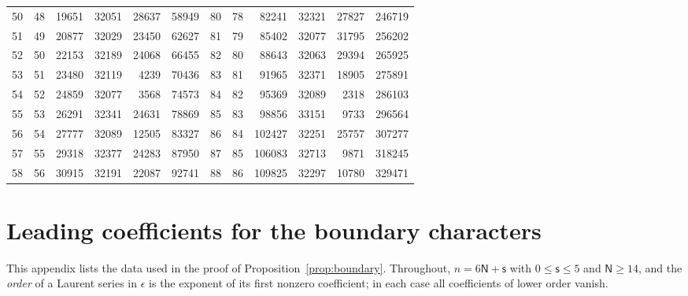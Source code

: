 \documentclass{amsart}
\theoremstyle{definition}
\theoremstyle{remark}
\numberwithin{equation}{section}
\begin{document}
\begin{table}[tp]
\begin{tabular}{rrrrrr@{\qquad}rrrrrr}
50&48&19651&32051&28637&58949&80&78&82241&32321&27827&246719\\
51&49&20877&32029&23450&62627&81&79&85402&32077&31795&256202\\
52&50&22153&32189&24068&66455&82&80&88643&32063&29394&265925\\
53&51&23480&32119&4239&70436&83&81&91965&32371&18905&275891\\
54&52&24859&32077&3568&74573&84&82&95369&32089&2318&286103\\
55&53&26291&32341&24631&78869&85&83&98856&33151&9733&296564\\
56&54&27777&32089&12505&83327&86&84&102427&32251&25757&307277\\
57&55&29318&32377&24283&87950&87&85&106083&32713&9871&318245\\
58&56&30915&32191&22087&92741&88&86&109825&32297&10780&329471\\
\bottomrule\end{tabular}\end{table}

\section{Leading coefficients for the boundary characters}\label{app:boundary}

This appendix lists the data used in the proof of Proposition~\ref{prop:boundary}. Throughout,
$n=6\mathsf N+\mathsf s$ with $0\le\mathsf s\le5$ and $\mathsf N\ge14$, and the \emph{order}
of a Laurent series in $\epsilon$ is the exponent of its first nonzero coefficient; in each
case all coefficients of lower order vanish.
\end{document}
